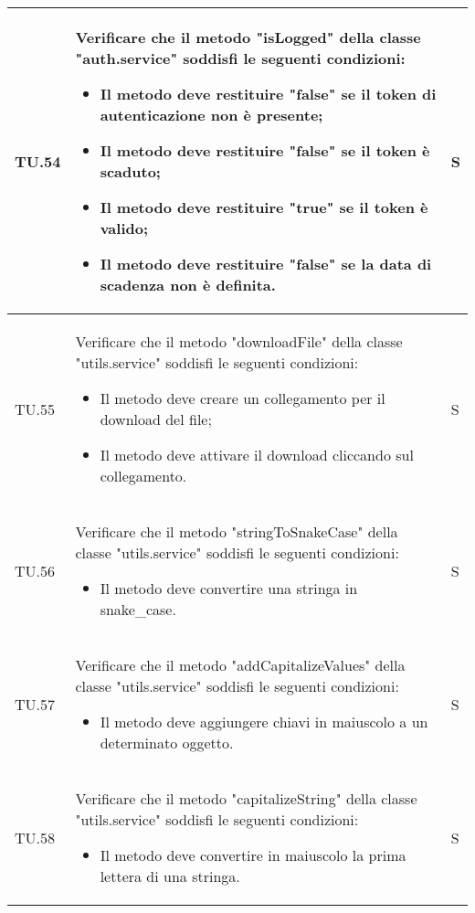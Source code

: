 \begin{adjustwidth}{-0.5cm}{-0.5cm}
\begin{longtable}{|P{1.5cm}|>{\raggedright}P{9.5cm}|>{\arraybackslash}P{1.5cm}|}
		\hline TU.54 & Verificare che il metodo "isLogged" della classe "auth.service" soddisfi le seguenti condizioni:
		\begin{itemize}
			\item Il metodo deve restituire "false" se il token di autenticazione non è presente;
			\item Il metodo deve restituire "false" se il token è scaduto;
			\item Il metodo deve restituire "true" se il token è valido;
			\item Il metodo deve restituire "false" se la data di scadenza non è definita.
    \end{itemize} & S \\

		\hline TU.55 & Verificare che il metodo "downloadFile" della classe "utils.service" soddisfi le seguenti condizioni:
		\begin{itemize}
			\item Il metodo deve creare un collegamento per il download del file;
			\item Il metodo deve attivare il download cliccando sul collegamento.
    \end{itemize} & S \\

		\hline TU.56 & Verificare che il metodo "stringToSnakeCase" della classe "utils.service" soddisfi le seguenti condizioni:
		\begin{itemize}
			\item Il metodo deve convertire una stringa in snake\_case.
    \end{itemize} & S \\

		\hline TU.57 & Verificare che il metodo "addCapitalizeValues" della classe "utils.service" soddisfi le seguenti condizioni:
		\begin{itemize}
			\item Il metodo deve aggiungere chiavi in maiuscolo a un determinato oggetto.
    \end{itemize} & S \\

		\hline TU.58 & Verificare che il metodo "capitalizeString" della classe "utils.service" soddisfi le seguenti condizioni:
		\begin{itemize}
			\item Il metodo deve convertire in maiuscolo la prima lettera di una stringa.
    \end{itemize} & S \\
	\end{longtable}
\end{adjustwidth}
\egroup
